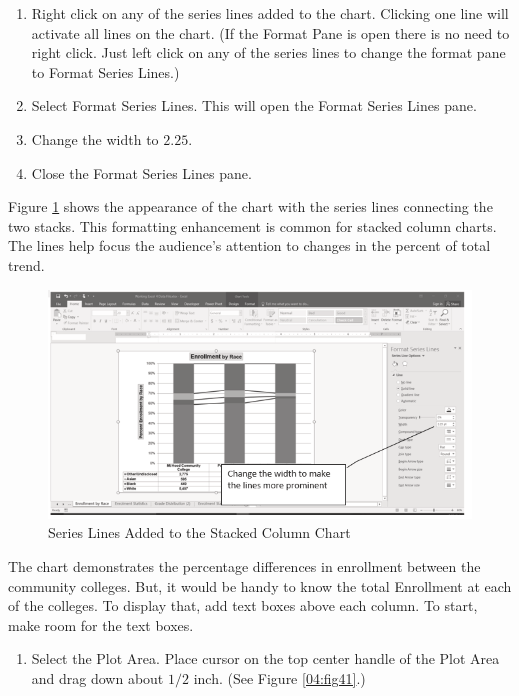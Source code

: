 \begin{enumerate}
	\item Right click on any of the series lines added to the chart. Clicking one line will activate all lines on the chart. (If the Format Pane is open there is no need to right click. Just left click on any of the series lines to change the format pane to Format Series Lines.)
	\item Select Format Series Lines. This will open the Format Series Lines pane.
	\item Change the width to $ 2.25 $.
	\item Close the Format Series Lines pane.
\end{enumerate}

Figure \ref{04:fig40} shows the appearance of the chart with the series lines connecting the two stacks. This formatting enhancement is common for stacked column charts. The lines help focus the audience's attention to changes in the percent of total trend.

\begin{figure}[H]
	\centering
	\includegraphics[width=\maxwidth{.95\linewidth}]{gfx/ch04_fig40}
	\caption{Series Lines Added to the Stacked Column Chart}
	\label{04:fig40}
\end{figure}

The chart demonstrates the percentage differences in enrollment between the community colleges. But, it would be handy to know the total Enrollment at each of the colleges. To display that, add text boxes above each column. To start, make room for the text boxes.

\begin{enumerate}
	\item Select the Plot Area. Place cursor on the top center handle of the Plot Area and drag down about $ 1/2 $ inch. (See Figure \ref{04:fig41}.)
\end{enumerate}

